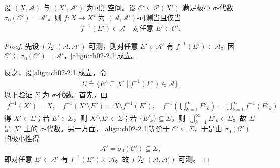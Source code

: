 \documentclass[../../main.tex]{subfiles}%
\begin{document}
\begin{lemma}\label{lemma:ch02-生成集可测}
\label{lemma:ch02-基判定}
设 $(X,\mathscr A)$ 与 $(X',\mathscr A')$ 为可测空间。设 $\mathscr C'\subseteq\mathscr P(X')$ 满足极小 $\sigma$-代数 $\sigma_0(\mathscr C')=\mathscr A'$。则 $f:X\to X'$ 为 $(\mathscr A,\mathscr A')$-可测当且仅当
\begin{align}
f^{-1}(E')\in\mathscr A\quad\text{对任意 }E'\in\mathscr C'. \label{align:ch02-2.1}
\end{align}
\end{lemma}

\begin{proof}
先设 $f$ 为 $(\mathscr A,\mathscr A')$-可测，则对任意 $E'\in\mathscr A'$ 有 $f^{-1}(E')\in\mathscr A$。因 $\mathscr C'\subseteq\sigma_0(\mathscr C')=\mathscr A'$，\eqref{align:ch02-2.1}成立。

反之，设\eqref{align:ch02-2.1}成立，令
\begin{align*}
\Sigma\triangleq \{E'\subseteq X'\mid f^{-1}(E')\in\mathscr A\}.
\end{align*}
以下验证 $\Sigma$ 为 $\sigma$-代数。首先，由
\begin{align}
f^{-1}(X')=X,\quad f^{-1}(X'\setminus E')=X\setminus f^{-1}(E'),\quad
f^{-1}\!\left(\bigcup_{k=1}^\infty E'_k\right)=\bigcup_{k=1}^\infty f^{-1}(E'_k) \label{align:ch02-2.2}
\end{align}
得 $X'\in\Sigma$；若 $E'\in\Sigma$，则 $X'\setminus E'\in\Sigma$；若 $\{E'_k\}\subseteq\Sigma$，则 $\bigcup_{k=1}^\infty E'_k\in\Sigma$。故 $\Sigma$ 是 $X'$ 上的 $\sigma$-代数。另一方面，\eqref{align:ch02-2.1}等价于 $\mathscr C'\subseteq\Sigma$，于是由 $\sigma_0(\mathscr C')$ 的极小性得
\begin{align*}
\mathscr A'=\sigma_0(\mathscr C')\subseteq\Sigma,
\end{align*}
即对任意 $E'\in\mathscr A'$ 有 $f^{-1}(E')\in\mathscr A$。故 $f$ 为 $(\mathscr A,\mathscr A')$-可测。
\end{proof}
\end{document}
